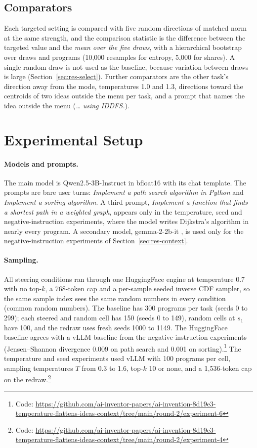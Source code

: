 \documentclass[11pt,letterpaper]{article}
\begin{document}
\subsection{Comparators}
\label{sec:comparators}

Each targeted setting is compared with five random directions of matched norm at the same strength, and the comparison statistic is the difference between the targeted value and the \emph{mean over the five draws}, with a hierarchical bootstrap over draws and programs (10{,}000 resamples for entropy, 5{,}000 for shares). A single random draw is not used as the baseline, because variation between draws is large (Section~\ref{sec:res-select}). Further comparators are the other task's direction away from the mode, temperatures 1.0 and 1.3, directions toward the centroids of two ideas outside the menu per task, and a prompt that names the idea outside the menu (\emph{\ldots{} using IDDFS.}).

\section{Experimental Setup}
\label{sec:setup}

\paragraph{Models and prompts.} The main model is Qwen2.5-3B-Instruct \citep{Yang2024} in bfloat16 with its chat template. The prompts are bare user turns: \emph{Implement a path search algorithm in Python} and \emph{Implement a sorting algorithm}. A third prompt, \emph{Implement a function that finds a shortest path in a weighted graph}, appears only in the temperature, seed and negative-instruction experiments, where the model writes Dijkstra's algorithm in nearly every program. A secondary model, gemma-2-2b-it \citep{Riviere2024}, is used only for the negative-instruction experiments of Section~\ref{sec:res-context}.

\paragraph{Sampling.} All steering conditions ran through one HuggingFace engine at temperature 0.7 with no top-$k$, a 768-token cap and a per-sample seeded inverse CDF sampler, so the same sample index sees the same random numbers in every condition (common random numbers). The baseline has 300 programs per task (seeds 0 to 299); each steered and random cell has 150 (seeds 0 to 149), random cells at $s_1$ have 100, and the redraw uses fresh seeds 1000 to 1149. The HuggingFace baseline agrees with a vLLM \citep{Kwon2023} baseline from the negative-instruction experiments (Jensen--Shannon divergence 0.009 on path search and 0.001 on sorting).\footnote{Code: \url{https://github.com/ai-inventor-papers/ai-invention-8d19e3-temperature-flattens-ideas-context/tree/main/round-2/experiment-6}} The temperature and seed experiments used vLLM with 100 programs per cell, sampling temperatures $T$ from 0.3 to 1.6, top-$k$ 10 or none, and a 1{,}536-token cap on the redraw.\footnote{Code: \url{https://github.com/ai-inventor-papers/ai-invention-8d19e3-temperature-flattens-ideas-context/tree/main/round-2/experiment-4}}
\end{document}
